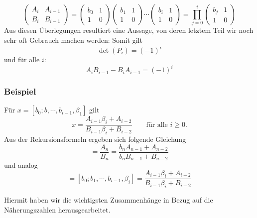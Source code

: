 \begin{beispiel}
\begin{equation}
		\begin{pmatrix}
			A_i&	A_{i-1}\\
			B_i&	B_{i-1}
		\end{pmatrix}
		=\begin{pmatrix}
			b_0	&	1\\
			1	&	0
		\end{pmatrix}
		\begin{pmatrix}
			b_1	&	1\\
			1	&	0
		\end{pmatrix}
		\cdots
		\begin{pmatrix}
			b_i	&	1\\
			1	&	0
		\end{pmatrix} 
		=\displaystyle\prod_{j=0}^{i}\begin{pmatrix}
			b_j	&	1\\
			1	&	0
		\end{pmatrix}
\end{equation}
Aus diesen Überlegungen resultiert eine Aussage, von deren letztem 
Teil wir noch sehr oft Gebrauch machen werden:
Somit gilt 
\begin{equation}
\det(P_i) = (-1)^i
\end{equation}
und für alle $i$:
\begin{equation}
A_iB_{i-1} - B_iA_{i-1} = (-1)^i
\end{equation}
\subsubsection{Beispiel}
Für $x = [b_0;b,\cdots,b_{i-1},\beta_1]$ gilt
\begin{equation}
x = \frac{A_{i-1}\beta_i + A_{i-2}}{B_{i-1}\beta_i + B_{i-2}}
\qquad \text{für alle $i \ge 0$.}
\end{equation}
Aus der Rekursionsformeln ergeben sich folgende Gleichung
\begin{equation}
[b_0;b_1,\cdots,b_n]
=
\frac{A_n}{B_n} = \frac{b_nA_{n-1} + A_{n-2}}{b_nB_{n-1} + B_{n-2}}
\end{equation}
und analog
\begin{equation}
[b_0;b,\cdots,b_{i-1},\beta_1] = [b_0;b_1,\cdots,b_{i-1},\beta_i]
=
\frac{A_{i-1}\beta_i + A_{i-2}}{B_{i-1}\beta_i + B_{i-2}}
\end{equation}
\end{beispiel}
Hiermit haben wir die wichtigsten Zusammenhänge in Bezug auf die Näherungszahlen herausgearbeitet.

